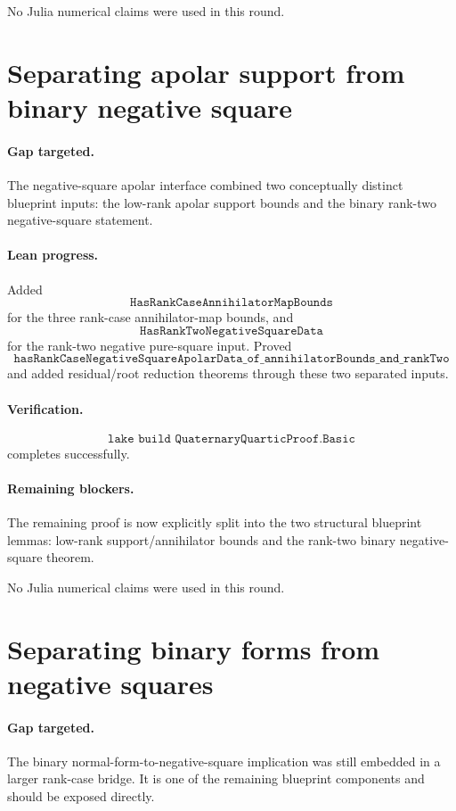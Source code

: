 \documentclass[11pt]{article}
\begin{document}
No Julia numerical claims were used in this round.

\section*{Separating apolar support from binary negative square}

\paragraph{Gap targeted.}
The negative-square apolar interface combined two conceptually distinct
blueprint inputs: the low-rank apolar support bounds and the binary rank-two
negative-square statement.

\paragraph{Lean progress.}
Added
\[
\texttt{HasRankCaseAnnihilatorMapBounds}
\]
for the three rank-case annihilator-map bounds, and
\[
\texttt{HasRankTwoNegativeSquareData}
\]
for the rank-two negative pure-square input.  Proved
\[
\texttt{hasRankCaseNegativeSquareApolarData\_of\_annihilatorBounds\_and\_rankTwo}
\]
and added residual/root reduction theorems through these two separated inputs.

\paragraph{Verification.}
\[
\texttt{lake build QuaternaryQuarticProof.Basic}
\]
completes successfully.

\paragraph{Remaining blockers.}
The remaining proof is now explicitly split into the two structural blueprint
lemmas: low-rank support/annihilator bounds and the rank-two binary
negative-square theorem.

No Julia numerical claims were used in this round.

\section*{Separating binary forms from negative squares}

\paragraph{Gap targeted.}
The binary normal-form-to-negative-square implication was still embedded in a
larger rank-case bridge.  It is one of the remaining blueprint components and
should be exposed directly.
\end{document}
